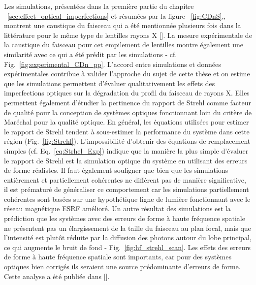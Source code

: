 \begin{refsection}
Les simulations, présentées dans la première partie du chapitre ~\ref{sec:effect_optical_imperfections} et résumées par la figure ~\ref{fig:CDnS},, montrent une caustique du faisceau qui a été mentionnée plusieurs fois dans la littérature pour le même type de lentilles rayons X [\cite{Schropp2013,Seiboth2017,Seiboth2020}]. La mesure expérimentale de la caustique du faisceau pour cet empilement de lentilles montre également une similarité avec ce qui a été prédit par les simulations - cf. Fig.~\ref{fig:experimental_CDn_pp}. L’accord entre simulations et données expérimentales contribue à valider l’approche du sujet de cette thèse et on estime que les simulations permettent d'évaluer qualitativement les effets des imperfections optiques sur la dégradation du profil du faisceau de rayons X. Elles permettent également d'étudier la pertinence du rapport de Strehl comme facteur de qualité pour la conception de systèmes optiques fonctionnant loin du critère de Maréchal pour la qualité optique. En général, les équations utilisées pour estimer le rapport de Strehl tendent à sous-estimer la performance du système dans cette région (Fig.~\ref{fig:Strehl}). L’impossibilité d'obtenir des équations de remplacement simples (cf. Eq.~\ref{eq:Strhel_Exp}) indique que la manière la plus simple d'évaluer le rapport de Strehl est la simulation optique du système en utilisant des erreurs de forme réalistes. Il faut également souligner que bien que les simulations entièrement et partiellement cohérentes ne diffèrent pas de manière significative, il est prématuré de généraliser ce comportement car les simulations partiellement cohérentes sont basées sur une hypothétique ligne de lumière fonctionnant avec le réseau magnétique ESRF amélioré. Un autre résultat des simulations est la prédiction que les systèmes avec des erreurs de forme à haute fréquence spatiale ne présentent pas un élargissement de la taille du faisceau au plan focal, mais que l'intensité est plutôt réduite par la diffusion des photons autour du lobe principal, ce qui augmente le bruit de fond - Fig.~\ref{fig:hf_strehl_scan}. Les effets des erreurs de forme à haute fréquence spatiale sont importants, car pour des systèmes optiques bien corrigés ils seraient une source prédominante d'erreurs de forme. Cette analyse a été publiée dans [\cite{Celestre2020}].



\end{refsection}
